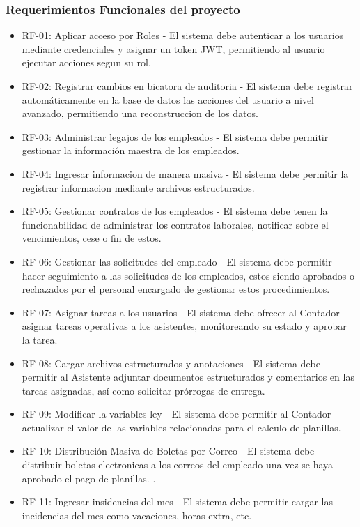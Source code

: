 \subsubsection{Requerimientos Funcionales del proyecto}
  \begin{itemize}
    \item RF-01: Aplicar acceso por Roles - El sistema debe autenticar a los usuarios mediante credenciales y asignar un token JWT, permitiendo al usuario ejecutar acciones segun su rol.
    \item RF-02: Registrar cambios en bicatora de auditoria - El sistema debe registrar automáticamente en la base de datos las acciones del usuario a nivel avanzado, permitiendo una reconstruccion de los datos.
    \item RF-03: Administrar legajos de los empleados - El sistema debe permitir gestionar la información maestra de los empleados.
    \item RF-04: Ingresar informacion de manera masiva - El sistema debe permitir la registrar informacion mediante archivos estructurados.
    \item RF-05: Gestionar contratos de los empleados - El sistema debe tenen la funcionabilidad de administrar los contratos laborales, notificar sobre el vencimientos, cese o fin de estos.
    \item RF-06: Gestionar las solicitudes del empleado - El sistema debe permitir hacer seguimiento a las solicitudes de los empleados, estos siendo aprobados o rechazados por el personal encargado de gestionar estos procedimientos. 
    \item RF-07: Asignar tareas a los usuarios - El sistema debe ofrecer al Contador asignar tareas operativas a los asistentes, monitoreando su estado y aprobar la tarea.
    \item RF-08: Cargar archivos estructurados y anotaciones - El sistema debe permitir al Asistente adjuntar documentos estructurados y comentarios en las tareas asignadas, así como solicitar prórrogas de entrega.
    \item RF-09: Modificar la variables ley - El sistema debe permitir al Contador actualizar el valor de las variables relacionadas para el calculo de planillas.
    \item RF-10: Distribución Masiva de Boletas por Correo - El sistema debe distribuir boletas electronicas a los correos del empleado una vez se haya aprobado el pago de planillas. .
    \item RF-11: Ingresar insidencias del mes - El sistema debe permitir cargar las incidencias del mes como vacaciones, horas extra, etc.

\end{itemize}
